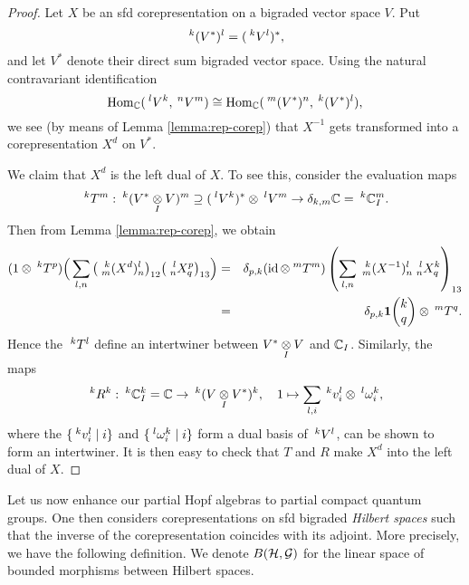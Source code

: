\begin{proof} Let $X$ be an sfd corepresentation on a bigraded vector space $V$. Put \[\Gru{(V^*)}{k}{l} = (\Gru{V}{k}{l})^*,\] and let $V^*$ denote their direct sum bigraded vector space. Using the natural contravariant identification \[\Hom_\C(\Gru{V}{l}{k},\Gru{V}{n}{m})\cong \Hom_\C(\Gru{(V^*)}{m}{n},\Gru{(V^*)}{k}{l}),\] we see (by means of Lemma \ref{lemma:rep-corep}) that $X^{-1}$ gets transformed into a corepresentation $X^d$ on $V^*$. 

We claim that $X^d$ is the left dual of $X$. To see this, consider the evaluation maps \[\Gru{T}{k}{m}: \Gru{(V^*\iitimes V)}{k}{m} \supseteq (\Gru{V}{l}{k})^*\otimes \Gru{V}{l}{m}\rightarrow \delta_{k,m} \C = \Gru{\C_I}{k}{m}.\] Then from Lemma \ref{lemma:rep-corep}, we obtain \begin{eqnarray*} (1\otimes \Gru{T}{k}{p})\Big{(} \sum_{l,n} \big{(} \Gr{(X^d)}{k}{l}{m}{n}\big{)}_{12} \big{(}\Gr{X}{l}{p}{n}{q}\big{)}_{13}\Big{)} &=& \delta_{p,k}(\id\otimes \Gru{T}{m}{m}) \left( \sum_{l,n}  \Gr{(X^{-1})}{k}{l}{m}{n}\Gr{X}{l}{k}{n}{q}\right)_{13} \\ &=& \delta_{p,k}\UnitC{k}{q}\otimes \Gru{T}{m}{q}.\end{eqnarray*} Hence the $\Gru{T}{k}{l}$ define an intertwiner between $V^*\iitimes V$ and $\C_I$. Similarly, the maps  \[\Gru{R}{k}{k}: \Gru{\C_I}{k}{k} = \C\rightarrow \Gru{(V\iitimes V^*)}{k}{k},\quad 1\mapsto \sum_{l,i} \Gru{v_i}{k}{l}\otimes \Gru{\omega_i}{l}{k},\] where the $\{\Gru{v_i}{k}{l}\mid i\}$ and $\{\Gru{\omega_i}{l}{k} \mid i\}$ form a dual basis of $\Gru{V}{k}{l}$, can be shown to form an intertwiner. It is then easy to check that $T$ and $R$ make $X^d$ into the left dual of $X$. %
\end{proof}

Let us now enhance our partial Hopf algebras to partial compact quantum groups. One then considers corepresentations on sfd bigraded \emph{Hilbert spaces} such that the inverse of the corepresentation coincides with its adjoint. More precisely, we have the following definition. We denote $B(\Hsp,\mathcal{G})$ for the linear space of bounded morphisms between Hilbert spaces.


